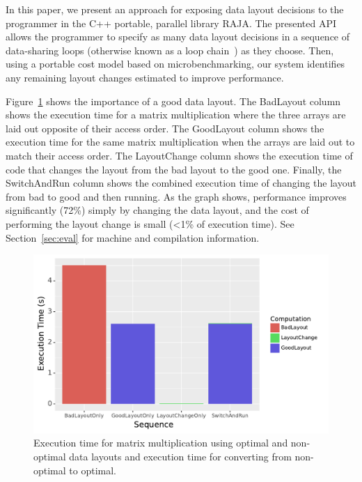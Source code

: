 \documentclass[sigconf,review=true]{acmart}
\begin{document}
In this paper, we present an approach for exposing data layout decisions to the programmer in the C++ portable, parallel library RAJA.
The presented API allows the programmer to specify as many data layout decisions in a sequence of data-sharing loops (otherwise known as a loop chain~\cite{krieger2013loop}) as they choose.
Then, using a portable cost model based on microbenchmarking, our system identifies any remaining layout changes estimated to improve performance.  

Figure~\ref{IntroExample} shows the importance of a good data layout. 
The BadLayout column shows the execution time for a matrix multiplication where the three arrays are laid out opposite of their access order. 
The GoodLayout column shows the execution time for the same matrix multiplication when the arrays are laid out to match their access order.
The LayoutChange column shows the execution time of code that changes the layout from the bad layout to the good one.
Finally, the SwitchAndRun column shows the combined execution time of changing the layout from bad to good and then running.
As the graph shows, performance improves  significantly (72\%) simply by changing the data layout, and the cost of performing the layout change is small (<1\% of execution time). 
See Section~\ref{sec:eval} for machine and compilation information.

\begin{figure}
	\includegraphics[width=\columnwidth]{IntroExampleGraph.pdf}
	\caption{Execution time for matrix multiplication using optimal and non-optimal data layouts and execution time for converting from non-optimal to optimal.}
	\label{IntroExample}
\end{figure}
\end{document}
